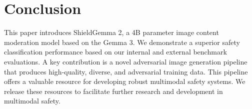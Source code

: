 
\section{Conclusion}

This paper introduces ShieldGemma 2, a 4B parameter image content moderation model based on the Gemma 3. We demonstrate a superior safety classification performance based on our internal and external benchmark evaluations. A key contribution is a novel adversarial image generation pipeline that produces high-quality, diverse, and adversarial training data. This pipeline offers a valuable resource for developing robust multimodal safety systems. We release these resources to facilitate further research and development in multimodal safety.

